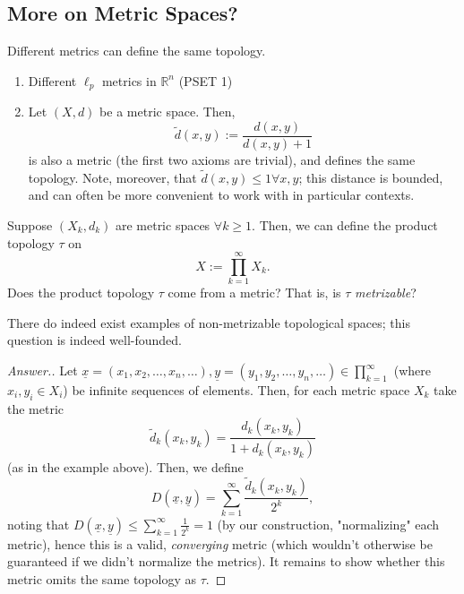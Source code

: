 \subsection{More on Metric Spaces?}

\begin{proposition}
    Different metrics can define the same topology.
\end{proposition}
\begin{example}
    \begin{enumerate}
        \item Different $\ell_p$ metrics in $\mathbb{R}^n$ (PSET 1)
        \item Let $(X, d)$ be a metric space. Then, \[
        \tilde{d}(x,y) := \frac{d(x,y)}{d(x,y)+1}
        \]
        is also a metric (the first two axioms are trivial), and defines the same topology. Note, moreover, that $\tilde{d}(x,y) \leq 1 \forall x, y$; this distance is bounded, and can often be more convenient to work with in particular contexts.
    \end{enumerate}
\end{example}

\begin{question}
    Suppose $(X_k, d_k)$ are metric spaces $\forall k \geq 1$. Then, we can define the product topology $\tau$ on  \[
        X := \prod_{k=1}^{\infty} X_k.    
        \]
        Does the product topology $\tau$ come from a metric? That is, is $\tau$ \emph{metrizable}?
\end{question}

\begin{remark}
    There do indeed exist examples of non-metrizable topological spaces; this question is indeed well-founded.
\end{remark}

\begin{proof}[Answer.]
    Let $\underline{x}=(x_1, x_2, \dots, x_n, \dots), \underline{y}=(y_1, y_2, \dots, y_n, \dots) \in \prod_{k=1}^\infty$ (where $x_i, y_i \in X_i$) be infinite sequences of elements. Then, for each metric space $X_k$ take the metric $$\tilde{d}_k(x_k, y_k) = \frac{d_k(x_k,y_k)}{1+d_k(x_k,y_k)}$$ (as in the example above). Then, we define \[
    D(\underline{x}, \underline{y}) = \sum_{k=1}^{\infty} \frac{\tilde{d}_k(x_k, y_k)}{2^k},
    \]
    noting that $D(\underline{x}, \underline{y}) \leq \sum_{k=1}^\infty \frac{1}{2^k} = 1$ (by our construction, "normalizing" each metric), hence this is a valid, \emph{converging} metric (which wouldn't otherwise be guaranteed if we didn't normalize the metrics). It remains to show whether this metric omits the same topology as $\tau$. 
\end{proof}

